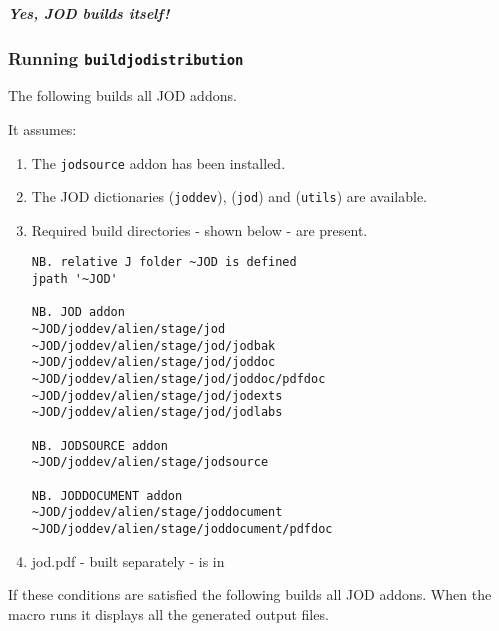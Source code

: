 \documentclass[11pt,letter,landscape]{article}
\begin{document}
\textbf{\emph{Yes, JOD builds itself!}}

    \subsubsection{\texorpdfstring{Running
\texttt{buildjodistribution}}{Running buildjodistribution}}\label{running-buildjodistribution}

The following builds all JOD addons.

It assumes:

\begin{enumerate}
\def\labelenumi{\arabic{enumi}.}
\item
  The \texttt{jodsource} addon has been installed.
\item
  The JOD dictionaries (\texttt{joddev}), (\texttt{jod}) and
  (\texttt{utils}) are available.
\item
  Required build directories - shown below - are present.

\begin{verbatim}
NB. relative J folder ~JOD is defined
jpath '~JOD'

NB. JOD addon
~JOD/joddev/alien/stage/jod
~JOD/joddev/alien/stage/jod/jodbak
~JOD/joddev/alien/stage/jod/joddoc
~JOD/joddev/alien/stage/jod/joddoc/pdfdoc
~JOD/joddev/alien/stage/jod/jodexts
~JOD/joddev/alien/stage/jod/jodlabs

NB. JODSOURCE addon
~JOD/joddev/alien/stage/jodsource

NB. JODDOCUMENT addon
~JOD/joddev/alien/stage/joddocument
~JOD/joddev/alien/stage/joddocument/pdfdoc
\end{verbatim}
\item
  jod.pdf - built separately - is in
\end{enumerate}

If these conditions are satisfied the following builds all JOD addons.
When the macro runs it displays all the generated output files.
\end{document}
